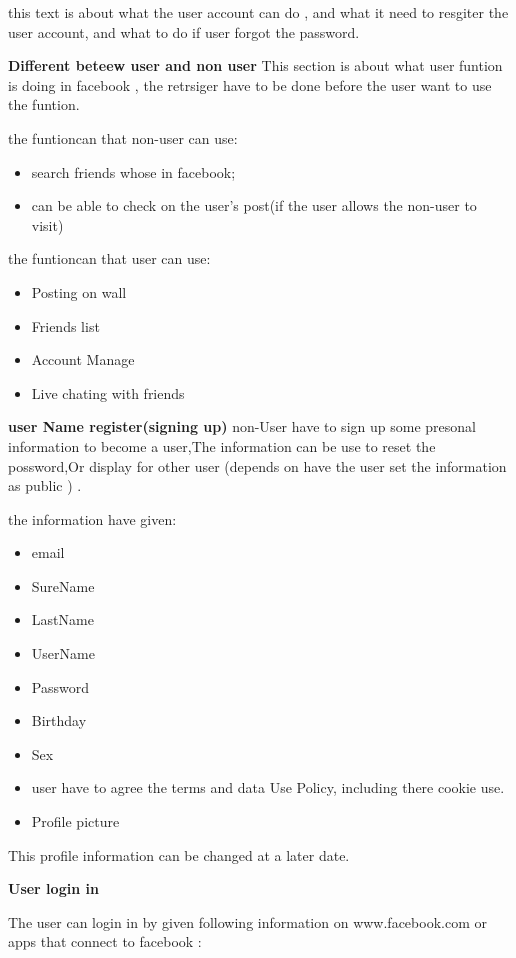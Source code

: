 this text is about what the user account can do , and what it need to resgiter
the user account, and what to do if user forgot the password.

\textbf{Different beteew user and non user}
This section is about what user funtion is doing in facebook , the retrsiger
have to be done before the user want to use the funtion.

the funtioncan that non-user can use:
\begin{itemize}
\item search friends whose in facebook;
\item can be able to check on the user's post(if the user allows the non-user to
visit)
\end{itemize}

the funtioncan that user can use:
\begin{itemize}
\item Posting on wall
\item Friends list 
\item Account Manage
\item Live chating with friends
\end{itemize}

\textbf{user Name register(signing up)}
non-User have to sign up some presonal information to become a user,The
information can be use to reset the possword,Or display for other user (depends
on have the user set the information as public ) .

the information have given:
\begin{itemize}
\item email
\item SureName
\item LastName
\item UserName
\item Password
\item Birthday
\item Sex
\item user have to agree the terms and data Use Policy, including there cookie
      use.
\item Profile picture
\end{itemize}
This profile information can be changed at a later date.

\textbf{User login in}

The user can login in by given following information on www.facebook.com or apps
that connect to facebook : 

